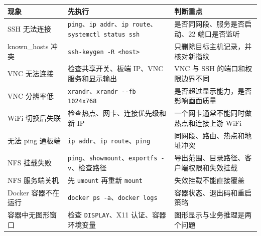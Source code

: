 \begin{longtable}[]{@{}
  >{\raggedright\arraybackslash}p{}
  >{\raggedright\arraybackslash}p{}
  >{\raggedright\arraybackslash}p{}@{}}
\toprule\noalign{}
\begin{minipage}[b]{\linewidth}\raggedright
现象
\end{minipage} & \begin{minipage}[b]{\linewidth}\raggedright
先执行
\end{minipage} & \begin{minipage}[b]{\linewidth}\raggedright
判断重点
\end{minipage} \\
\midrule\noalign{}
\endhead
\bottomrule\noalign{}
\endlastfoot
SSH 无法连接 &
\passthrough{\lstinline!ping!}、\passthrough{\lstinline!ip addr!}、\passthrough{\lstinline!ip route!}、\passthrough{\lstinline!systemctl status ssh!}
& 是否同网段、服务是否启动、22 端口是否监听 \\
known\_hosts 冲突 & \passthrough{\lstinline!ssh-keygen -R <host>!} &
只删除目标主机记录，并核对新指纹 \\
VNC 无法连接 & 检查共享开关、板端 IP、VNC 服务和显示输出 & VNC 与 SSH
的端口和权限边界不同 \\
VNC 分辨率低 &
\passthrough{\lstinline!xrandr!}、\passthrough{\lstinline!xrandr --fb 1024x768!}
& 是否超过显示能力，是否影响画面质量 \\
WiFi 切换后失联 & 检查热点、网卡、连接优先级和新 IP &
一个网卡通常不能同时做热点和连接上游 WiFi \\
无法 ping 通板端 &
\passthrough{\lstinline!ip addr!}、\passthrough{\lstinline!ip route!}、\passthrough{\lstinline!ping!}
& 同网段、路由、热点和地址冲突 \\
NFS 挂载失败 &
\passthrough{\lstinline!ping!}、\passthrough{\lstinline!showmount!}、\passthrough{\lstinline!exportfs -v!}、检查路径
& 导出范围、目录路径、客户端权限和失效挂载 \\
NFS 服务端关机 & 先 \passthrough{\lstinline!umount!} 再重新
\passthrough{\lstinline!mount!} & 失效挂载不能直接覆盖 \\
Docker 容器不在运行 &
\passthrough{\lstinline!docker ps -a!}、\passthrough{\lstinline!docker logs!}
& 容器状态、退出码和重启策略 \\
容器中无图形窗口 & 检查 \passthrough{\lstinline!DISPLAY!}、X11
认证、容器环境变量 & 图形显示与业务推理是两个问题 \\

\end{longtable}
